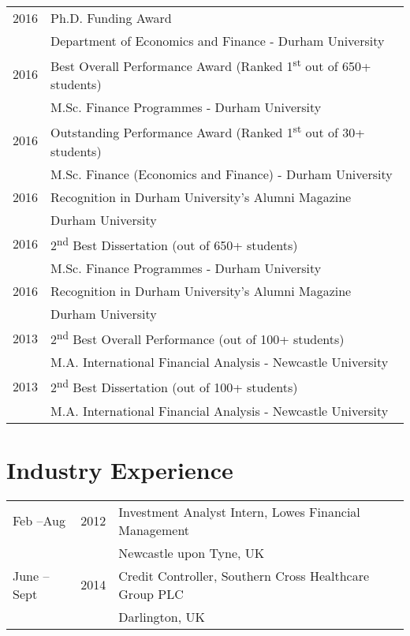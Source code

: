 \documentclass[margin,line,pifont,palatino,courier]{res}
\newcommand{\ts}{\textsuperscript}
\begin{document}
\begin{resume}
\begin{longtable}{@{}p{0.7in}p{4in}}
2016 & Ph.D. Funding Award \\
           &Department of Economics and Finance - Durham University  \\
\rule{0pt}{4ex}2016 & Best Overall Performance Award (Ranked 1\ts{st} out of 650+ students)  \\
           & M.Sc. Finance Programmes - Durham University  \\
\rule{0pt}{4ex}2016 & Outstanding Performance Award (Ranked 1\ts{st} out of 30+ students)  \\
           & M.Sc. Finance (Economics and Finance) - Durham University  \\
\rule{0pt}{4ex}2016 & Recognition in Durham University's Alumni Magazine\\
           & Durham University\\
\rule{0pt}{4ex}2016 & 2\ts{nd} Best Dissertation (out of 650+ students)\\
           & M.Sc. Finance Programmes - Durham University\\
\rule{0pt}{4ex}2016 & Recognition in Durham University's Alumni Magazine\\
           & Durham University\\
\rule{0pt}{4ex}2013 & 2\ts{nd} Best Overall Performance (out of 100+ students)\\
           & M.A. International Financial Analysis - Newcastle University\\
\rule{0pt}{4ex}2013 & 2\ts{nd} Best Dissertation (out of 100+ students)\\
           & M.A. International Financial Analysis - Newcastle University
\end{longtable}

\hrulefill

\section{\sc \bf Industry Experience}

\begin{tabular}{@{}p{0.8in}p{0.5in}p{4in}}

Feb --Aug &2012 & Investment Analyst Intern, Lowes Financial Management \\
&&Newcastle upon Tyne, UK\\
\rule{0pt}{4ex}June --Sept & 2014& Credit Controller, Southern Cross Healthcare Group PLC \\
&&Darlington, UK
\end{tabular}


\end{resume}
\end{document}
